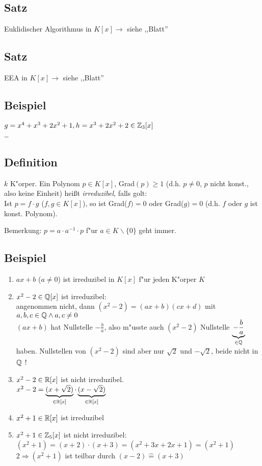 \subsection{Satz} Euklidischer Algorithmus in $K[x] \rightarrow$ siehe ,,Blatt''
\subsection{Satz} EEA in $K[x] \rightarrow$ siehe ,,Blatt''

\subsection{Beispiel}
$g=x^4+x^3 + 2x^2+1,  h= x^3+2x^2+2 \in \mathbb{Z}_3 [x]$\\
\dots

\subsection{Definition}
$k$ K"orper. Ein Polynom $p\in K[x]$, Grad$(p)\geq 1$ (d.h. $p\neq 0$, $p$ nicht konst., also keine Einheit) heißt \emph{irreduzibel}, falls golt: \\
Ist $p=f \cdot g$ ($f,g\in K[x]$), so ist Grad($f)= 0$ oder Grad($g)=0$ (d.h. $f$ oder $g$ ist konst. Polynom).

Bemerkung: $p= a \cdot a^{-1} \cdot p$ f"ur $a \in K \backslash \{0\}$ geht immer.
\subsection{Beispiel}
\begin{enumerate}
	\item
	$ax+b$ ($a \neq 0$) ist irreduzibel in $K[x]$ f"ur jeden K"orper $K$
	\item
	$x^2-2 \in \mathbb{Q}[x]$ ist irreduzibel:\\
	angenommen nicht, dann $(x^2-2) = (ax+b)(cx+d)$ mit $a,b,c \in \mathbb{Q} \land a,c \neq 0$\\
	$(ax+b)$ hat Nullstelle $-\frac{b}{a}$, also m"usste auch $(x^2-2)$ Nullstelle $\underbrace{-\frac{b}{a}}_{\in \mathbb{Q}}$ haben.
	Nullstellen von $(x^2-2)$ sind aber nur $\sqrt{2}$ und $-\sqrt{2}$, beide nicht in $\mathbb{Q}$ !
	\item
	$x^2-2 \in \mathbb{R}[x]$ ist nicht irreduzibel.\\
	$x^2-2 = \underbrace{(x+ \sqrt{2})}_{\in \mathbb{R}[x]} \cdot \underbrace{(x-\sqrt{2})}_{\in \mathbb{R}[x]}$
	\item
	$x^2+1 \in \mathbb{R}[x]$ ist irreduzibel
	\item
	$x^2+1 \in \mathbb{Z}_5[x]$ ist nicht irreduzibel:\\
	$(x^2 +1) = (x+2) \cdot (x+3) = (x^2 + 3x +2x +1) = (x^2+1)$\\
	$2 \Rightarrow (x^2+1)$ ist teilbar durch $(x-2) \hat{=} (x+3)$
\end{enumerate}

